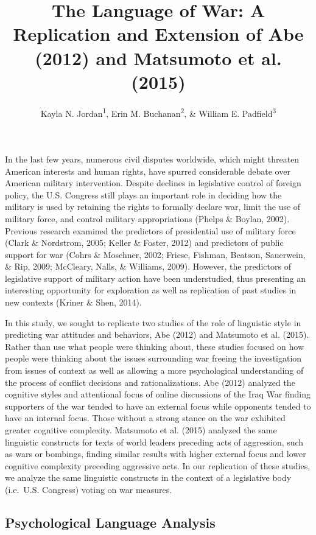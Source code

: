 \documentclass[english,,man,floatsintext]{apa6}
\title{The Language of War: A Replication and Extension of Abe (2012) and Matsumoto et al. (2015)}
\author{Kayla N. Jordan\textsuperscript{1}, Erin M. Buchanan\textsuperscript{2}, \& William E. Padfield\textsuperscript{3}}
\date{}
\affiliation{
\vspace{0.5cm}
\textsuperscript{1} University of Texas - Austin\\\textsuperscript{2} Harrisburg University of Science and Technology\\\textsuperscript{3} Missouri State University}
\begin{document}
\maketitle

In the last few years, numerous civil disputes worldwide, which might threaten American interests and human rights, have spurred considerable debate over American military intervention. Despite declines in legislative control of foreign policy, the U.S. Congress still plays an important role in deciding how the military is used by retaining the rights to formally declare war, limit the use of military force, and control military appropriations (Phelps \& Boylan, 2002). Previous research examined the predictors of presidential use of military force (Clark \& Nordstrom, 2005; Keller \& Foster, 2012) and predictors of public support for war (Cohrs \& Moschner, 2002; Friese, Fishman, Beatson, Sauerwein, \& Rip, 2009; McCleary, Nalls, \& Williams, 2009). However, the predictors of legislative support of military action have been understudied, thus presenting an interesting opportunity for exploration as well as replication of past studies in new contexts (Kriner \& Shen, 2014).

In this study, we sought to replicate two studies of the role of linguistic style in predicting war attitudes and behaviors, Abe (2012) and Matsumoto et al. (2015). Rather than use what people were thinking about, these studies focused on how people were thinking about the issues surrounding war freeing the investigation from issues of context as well as allowing a more psychological understanding of the process of conflict decisions and rationalizations. Abe (2012) analyzed the cognitive styles and attentional focus of online discussions of the Iraq War finding supporters of the war tended to have an external focus while opponents tended to have an internal focus. Those without a strong stance on the war exhibited greater cognitive complexity. Matsumoto et al. (2015) analyzed the same linguistic constructs for texts of world leaders preceding acts of aggression, such as wars or bombings, finding similar results with higher external focus and lower cognitive complexity preceding aggressive acts. In our replication of these studies, we analyze the same linguistic constructs in the context of a legislative body (i.e.~U.S. Congress) voting on war measures.

\hypertarget{psychological-language-analysis}{%
\subsection{Psychological Language Analysis}\label{psychological-language-analysis}}
\end{document}

